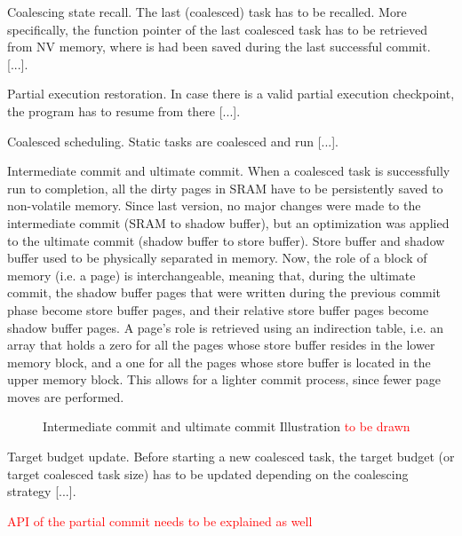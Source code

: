 Coalescing state recall. The last (coalesced) task has to be recalled. More specifically, the function pointer of the last coalesced task has to be retrieved from NV memory, where is had been saved during the last successful commit. [...].

Partial execution restoration. In case there is a valid partial execution checkpoint, the program has to resume from there [...].

Coalesced scheduling. Static tasks are coalesced and run [...].

Intermediate commit and ultimate commit. When a coalesced task is successfully run to completion, all the dirty pages in SRAM have to be persistently saved to non-volatile memory. Since last version, no major changes were made to the intermediate commit (SRAM to shadow buffer), but an optimization was applied to the ultimate commit (shadow buffer to store buffer). Store buffer and shadow buffer used to be physically separated in memory. Now, the role of a block of memory (i.e. a page) is interchangeable, meaning that, during the ultimate commit, the shadow buffer pages that were written during the previous commit phase become store buffer pages, and their relative store buffer pages become shadow buffer pages. A page’s role is retrieved using an indirection table, i.e. an array that holds a zero for all the pages whose store buffer resides in the lower memory block, and a one for all the pages whose store buffer is located in the upper memory block. This allows for a lighter commit process, since fewer page moves are performed.

\begin{figure}
	\caption{Intermediate commit and ultimate commit Illustration \textcolor{red}{to be drawn}}
\end{figure}

Target budget update. Before starting a new coalesced task, the target budget (or target coalesced task size) has to be updated depending on the coalescing strategy [...].

\textcolor{red}{API of the partial commit needs to be explained as well}